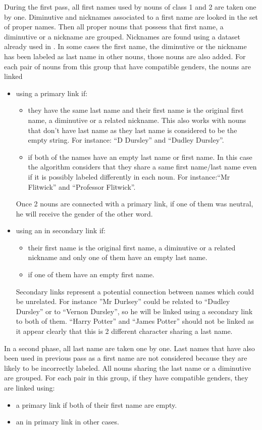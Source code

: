 \documentclass[a4paper, 12pt]{report}
\begin{document}
During the first pass, all first names used by nouns of class 1 and 2  are taken one by one. Diminutive and nicknames associated to a first name are looked in the set of proper names. Then all proper nouns that possess that first name, a diminutive or a nickname are grouped. Nicknames are found using a dataset \citep{dbNickname} already used in \cite{structure_clustering}.  In some cases the first name, the diminutive or the nickname has been labeled as last name in other nouns, those nouns are also added. For each pair of nouns from this group that have compatible genders, the nouns are linked
\begin{itemize}
\item
	 using a  primary link if:
	\begin{itemize}
	\item they have the same last name and their first name is the original first name, a diminutive or a related nickname. This also works with nouns that don't have last name as they last name is considered to be the empty string.  For instance: ``D Dursley'' and ``Dudley Dursley''. 
	\item if both of the names have an empty last name or first name. In this case the algorithm considers that they share a same first name/last name even if it is possibly labeled differently in each noun. For instance:``Mr Flitwick'' and ``Professor Flitwick''.
	\end{itemize}
	Once 2 nouns are connected with a  primary link, if one of them was neutral, he will receive the gender of the other word.
\item
	 using an  in secondary link if:
	 	\begin{itemize}
	\item their first name is the original first name, a diminutive or a related nickname and only one of them have an empty last name. 
	\item if one of them have an empty first name.
		\end{itemize}
	Secondary  links represent a potential connection between names which could be unrelated. For instance ''Mr Durlsey'' could be related to ``Dudley Dursley'' or to ``Vernon Dursley'', so he will be linked using a secondary link to both of them. ``Harry Potter'' and ``James Potter'' should not be linked as it appear clearly that this is 2 different character sharing a last name.
\end{itemize}

In a second phase, all last name are taken one by one. Last names that have also been used in previous pass as a first name are not considered because they are likely to be incorrectly labeled. All nouns sharing the last name or a diminutive are grouped. For each pair in this group, if they have compatible genders, they are linked using:
\begin{itemize}
\item a  primary link if both of their first name are empty. 
\item an in primary link in other cases.
\end{itemize}
\end{document}
